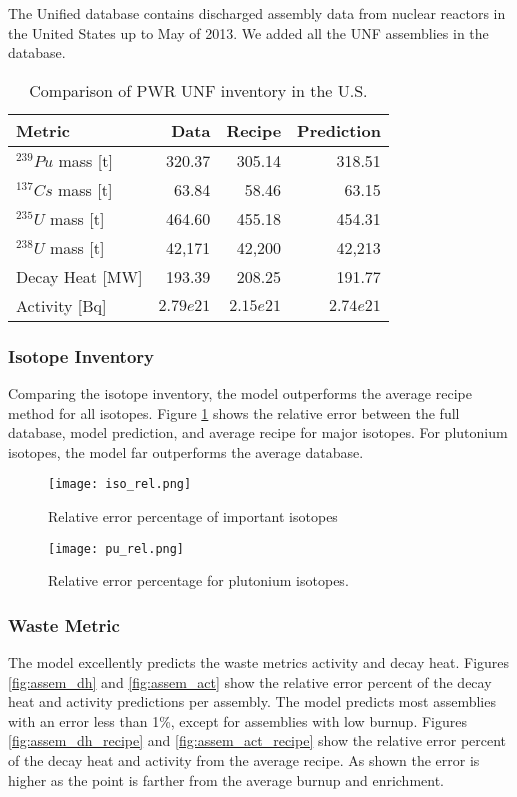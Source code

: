 The Unified database contains discharged assembly data
from nuclear reactors in the United States up to May of
2013. We added all the \gls{UNF} assemblies in the database.


\begin{table}[h]
    \centering
    \begin{tabular}{lrrr}
        \hline
        Metric & Data & Recipe & Prediction \\
        \hline
        $^{239}Pu$ mass [t] & 320.37 & 305.14 & 318.51\\
        $^{137}Cs$ mass [t] & 63.84 & 58.46 & 63.15 \\
        $^{235}U$ mass [t] & 464.60 & 455.18 & 454.31\\
        $^{238}U$ mass [t] & 42,171 & 42,200 & 42,213\\
        \hline
        Decay Heat [MW] & 193.39 & 208.25 & 191.77 \\
        Activity [Bq] & $2.79e21$ & $2.15e21$ & $2.74e21$ \\
        \hline
    \end{tabular}
    \caption{Comparison of \gls{PWR} \gls{UNF} inventory in the U.S.}
\end{table}

\FloatBarrier

\subsubsection{Isotope Inventory}

Comparing the isotope inventory, the model outperforms the
average recipe method for all isotopes.
Figure \ref{fig:iso_rel} shows the relative
error between the full database, model prediction, and
average recipe for
major isotopes. For plutonium isotopes, the model far
outperforms the average database.

\begin{figure}
    \centering
    \texttt{[image: iso\_rel.png]}
    \caption{Relative error percentage of important isotopes}
    \label{fig:iso_rel}
\end{figure}


\begin{figure}
    \centering
    \texttt{[image: pu\_rel.png]}
    \caption{Relative error percentage for plutonium isotopes.}
    \label{fig:pu_rel}
\end{figure}

\FloatBarrier


\subsubsection{Waste Metric}
The model excellently predicts the waste metrics activity
and decay heat. Figures \ref{fig:assem_dh} and \ref{fig:assem_act}
show the relative error percent of the decay heat and activity
predictions per assembly. The model predicts most assemblies
with an error less than 1\%, except for assemblies with low
burnup.
Figures \ref{fig:assem_dh_recipe} and
\ref{fig:assem_act_recipe} show the relative error percent
of the decay heat and activity from the average recipe.
As shown the error is higher as the point is farther from
the average burnup and enrichment.


